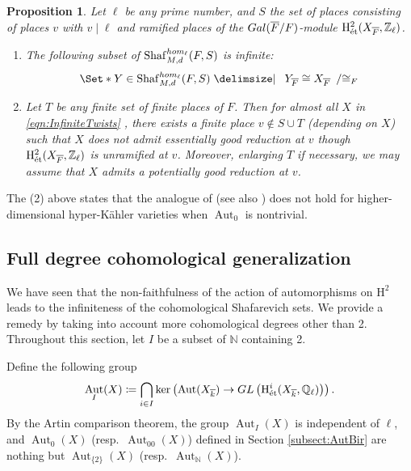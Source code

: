 \documentclass[11pt,reqno,oneside]{amsart}
\numberwithin{equation}{section}
\newtheorem{proposition}[theorem]{Proposition}
\theoremstyle{definition}
\DeclareMathOperator{\Aut}{Aut}
\newcommand{\Gal}{{\rm Gal}}
\newcommand{\GL}{{\rm GL}}
\DeclareMathOperator{\et}{\Acute{e}t}
\renewcommand{\hom}{{\rm hom}}
\newcommand{\Sha}{\mathrm{Shaf}}
\newcommand\rH{\mathrm{H}}
\newcommand{\NN}{\mathbb{N}}
\newcommand{\QQ}{\mathbb{Q}}
\newcommand{\ZZ}{\mathbb{Z}}
\begin{document}
\begin{proposition}
 \label{propgenkum}
    Let $\ell$ be any prime number, and $S$ the set of places consisting of places $v$ with $v\mid \ell$ and ramified places of the $\Gal(\overline{F}/F)$-module $\rH^2_{\et}(X_{\overline{F}},\ZZ_{\ell})$.
    \begin{enumerate}
    \item 
    The following subset of $\Sha^{\hom_\ell}_{M,d}(F,S)$ is infinite:
    \begin{equation}
        \label{eqn:InfiniteTwists}
        \Set*{Y \in \Sha^{\hom_\ell}_{M,d}(F,S)   \given 
        \begin{array}{l}
            Y_{\overline{F}}\cong X_{\overline{F}} 
        \end{array}}/{\cong_F}
    \end{equation}
\item
Let $T$ be any finite set of finite places of $F$.
Then for almost all $X$ in \eqref{eqn:InfiniteTwists} , 
there exists a finite place $v \notin S \cup T$ (depending on $X$) such that
$X$ does not admit essentially good reduction at $v$ though $\rH^{2}_{\et}(X_{\overline{F}},\ZZ_{\ell})$ is unramified at $v$. 
Moreover, enlarging $T$ if necessary, we may assume that $X$ admits a potentially good reduction at $v$.
\end{enumerate}
\end{proposition}
The (2) above states that the analogue of \cite[Theorem 1.3 (ii)]{LM18} (see also \cite[Introduction]{Takamatsu2020K3}) does not hold for higher-dimensional hyper-Kähler varieties when $\Aut_0$ is nontrivial. 


\subsection{Full degree cohomological generalization} 
\label{subsec:FullDegCohomShafConj}
We have seen that the non-faithfulness of the action of automorphisms on $\rH^2$ leads to the infiniteness of the cohomological Shafarevich sets. We provide a remedy by taking into account more cohomological degrees other than 2.  Throughout this section, let $I$ be a subset of $\NN$ containing 2. 

Define the following group
\begin{equation}
    \label{def:AutI}
\Aut_I(X)\coloneqq \bigcap_{i\in I}\ker\left(\Aut (X_{\overline{k}}) \rightarrow \GL\left(\rH^{i}_{\et}(X_{\overline{k}},\QQ_{\ell}) \right)\right). 
\end{equation}
By the Artin comparison theorem, the group $\Aut_I(X)$ is independent of $\ell$, and $\Aut_0(X)$  (resp.~$\Aut_{00}(X)$) defined in Section \ref{subsect:AutBir}
are nothing but $\Aut_{\{2\}}(X)$ (resp.~$\Aut_{\NN}(X)$).
\end{document}
